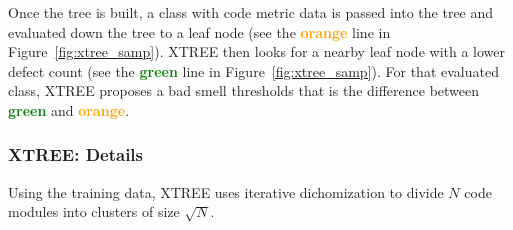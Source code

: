 \documentclass{sig-alternate}
\newcommand{\fig}[1]{Figure~\ref{fig:#1}}
\theoremstyle{break}
\begin{document}
     Once the tree is built, a class with code metric data is passed into the tree and evaluated down the tree to a leaf node (see the \textcolor{orange}{{\bf orange}} line in \fig{xtree_samp}).
       XTREE then looks for a nearby leaf node with a lower defect
      count (see the \textcolor{green}{{\bf green}} line in \fig{xtree_samp}). For that evaluated class, XTREE proposes a bad smell
      thresholds that is  the difference between 
      \textcolor{green}{{\bf green}} and \textcolor{orange}{{\bf orange}}. 
  
  
\subsubsection{XTREE:   Details}

Using the training data,  XTREE uses  
iterative dichomization to
  divide  $N$ code modules  into  clusters of
size $\sqrt{N}$.
\end{document}
